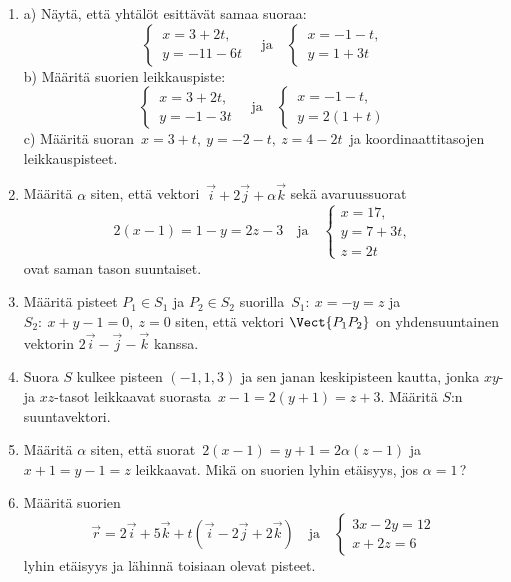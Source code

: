\pagebreak
\Harj
\begin{enumerate}

\item
a) Näytä, että yhtälöt esittävät samaa suoraa:
\[
\begin{cases} \,x=3+2t, \\ \,y=-11-6t \end{cases} \quad \text{ja} \quad
\begin{cases} \,x=-1-t, \\ \,y=1+3t \end{cases}
\]
b) Määritä suorien leikkauspiste:
\[
\begin{cases} \,x=3+2t, \\ \,y=-1-3t \end{cases} \quad \text{ja} \quad
\begin{cases} \,x=-1-t, \\ \,y=2(1+t) \end{cases}
\]
c) Määritä suoran $\,x=3+t,\ y=-2-t,\ z=4-2t\,$ ja koordinaattitasojen
leikkauspisteet.

\item
Määritä $\alpha$ siten, että vektori $\,\vec i+2\vec j+\alpha\vec k$ sekä avaruussuorat
\[
2(x-1)=1-y=2z-3 \quad \text{ja} \quad \begin{cases} x=17,\\y=7+3t,\\z=2t \end{cases}
\]
ovat saman tason suuntaiset.

\item
Määritä pisteet $P_1 \in S_1$ ja $P_2 \in S_2$ suorilla $\,S_1:\ x=-y=z$ ja 
$S_2:\ x+y-1=0,\ z=0$ siten, että vektori $\Vect{P_1P_2}$ on yhdensuuntainen vektorin
$2\vec i-\vec j-\vec k$ kanssa.

\item
Suora $S$ kulkee pisteen $(-1,1,3)$ ja sen janan keskipisteen kautta, jonka $xy$- ja $xz$-tasot
leikkaavat suorasta $\,x-1=2(y+1)=z+3$. Määritä $S$:n suuntavektori.

\item
Määritä $\alpha$ siten, että suorat $\,2(x-1)=y+1=2\alpha(z-1)$ ja $x+1=y-1=z$ leikkaavat.
Mikä on suorien lyhin etäisyys, jos $\alpha=1$\,?

\item
Määritä suorien
\[
\vec r=2\vec i+5\vec k+t(\vec i-2\vec j+2\vec k) \quad \text{ja} \quad
\begin{cases} 3x-2y=12\\x+2z=6 \end{cases}
\]
lyhin etäisyys ja lähinnä toisiaan olevat pisteet.


\end{enumerate}
